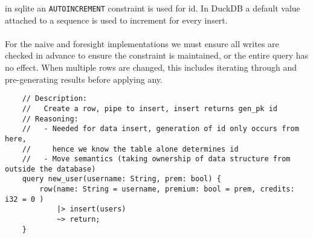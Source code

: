 in sqlite an \texttt{AUTOINCREMENT} constraint is used for id. In DuckDB a default value
attached to a sequence is used to increment for every insert.
\\
\\ For the naive and foresight implementations we must ensure all writes are checked in advance to ensure the constraint is maintained, or the entire query has no effect.
When multiple rows are changed, this includes iterating through and pre-generating results before applying any.
\begin{verbatim}
    // Description:
    //   Create a row, pipe to insert, insert returns gen_pk id
    // Reasoning:
    //   - Needed for data insert, generation of id only occurs from here,
    //     hence we know the table alone determines id
    //   - Move semantics (taking ownership of data structure from outside the database)
    query new_user(username: String, prem: bool) {
        row(name: String = username, premium: bool = prem, credits: i32 = 0 )
            |> insert(users)
            ~> return;
    }
\end{verbatim}

